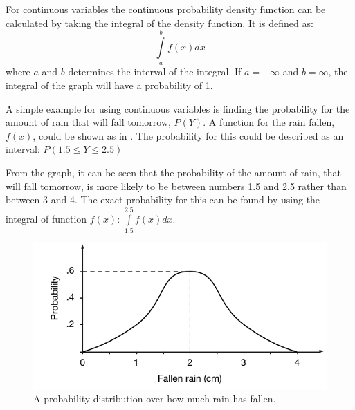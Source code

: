For continuous variables the continuous probability density function can be calculated by taking the integral of the density function. 
It is defined as:
\begin{equation}
\int\limits_{a}^{b} f(x)dx 
\end{equation}
where $a$ and $b$ determines the interval of the integral. 
If $a = -\infty$ and $b = \infty$, the integral of the graph will have a probability of 1.

A simple example for using continuous variables is finding the probability for the amount of rain that will fall tomorrow, $P(Y)$. 
A function for the rain fallen, $f(x)$, could be shown as in .
The probability for this could be described as an interval:
$P(1.5 \le Y \le 2.5)$

From the graph, it can be seen that the probability of the amount of rain, that will fall tomorrow, is more likely to be between numbers 1.5 and 2.5 rather than between 3 and 4.
The exact probability for this can be found by using the integral of function $f(x)$:
$\int\limits_{1.5}^{2.5} f(x)dx$.

\begin{figure}[h]
	\centering
	\includegraphics[scale = 0.7]{media/Theory/probability-density-function}
	\caption{A probability distribution over how much rain has fallen.}
	\label{figure:pdf-graph}
\end{figure}